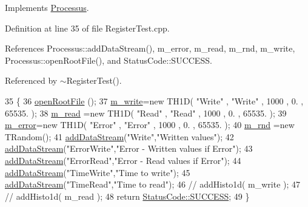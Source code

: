 Implements \hyperlink{classProcessus_aee88ad7b77ae7319cf8b128e9dd2ea11}{Processus}.



Definition at line 35 of file Register\+Test.\+cpp.



References Processus\+::add\+Data\+Stream(), m\+\_\+error, m\+\_\+read, m\+\_\+rnd, m\+\_\+write, Processus\+::open\+Root\+File(), and Status\+Code\+::\+S\+U\+C\+C\+E\+SS.



Referenced by $\sim$\+Register\+Test().


\begin{DoxyCode}
35                                       \{
36   \hyperlink{classProcessus_aacf6812880c1d1a2bf14a4a39458f443}{openRootFile} ();
37   \hyperlink{classRegisterTest_a4e2dbc640871ece43a554425e2b73dcf}{m\_write}=\textcolor{keyword}{new} TH1D( \textcolor{stringliteral}{"Write"} , \textcolor{stringliteral}{"Write"} , 1000 , 0. , 65535. );
38   \hyperlink{classRegisterTest_a5bb74853c26fdf7223244c569c64eb6d}{m\_read} =\textcolor{keyword}{new} TH1D( \textcolor{stringliteral}{"Read"}  , \textcolor{stringliteral}{"Read"}  , 1000 , 0. , 65535. );
39   \hyperlink{classRegisterTest_a9b32a49463a1b1d319fde007607254f0}{m\_error}=\textcolor{keyword}{new} TH1D( \textcolor{stringliteral}{"Error"} , \textcolor{stringliteral}{"Error"} , 1000 , 0. , 65535. );
40   \hyperlink{classRegisterTest_a07e35817b07d61e54caa694d2a0fa210}{m\_rnd} =\textcolor{keyword}{new} TRandom();
41   \hyperlink{classProcessus_a308c8f193802f1d1ab49d4447d0cb281}{addDataStream}(\textcolor{stringliteral}{"Write"},\textcolor{stringliteral}{"Written values"});
42   \hyperlink{classProcessus_a308c8f193802f1d1ab49d4447d0cb281}{addDataStream}(\textcolor{stringliteral}{"ErrorWrite"},\textcolor{stringliteral}{"Error - Written values if Error"});
43   \hyperlink{classProcessus_a308c8f193802f1d1ab49d4447d0cb281}{addDataStream}(\textcolor{stringliteral}{"ErrorRead"},\textcolor{stringliteral}{"Error - Read values if Error"});
44   \hyperlink{classProcessus_a308c8f193802f1d1ab49d4447d0cb281}{addDataStream}(\textcolor{stringliteral}{"TimeWrite"},\textcolor{stringliteral}{"Time to write"});
45   \hyperlink{classProcessus_a308c8f193802f1d1ab49d4447d0cb281}{addDataStream}(\textcolor{stringliteral}{"TimeRead"},\textcolor{stringliteral}{"Time to read"});
46   \textcolor{comment}{//  addHisto1d( m\_write );}
47   \textcolor{comment}{//  addHisto1d( m\_read );}
48   \textcolor{keywordflow}{return} \hyperlink{classStatusCode_a6f565cbeadc76d14c72f047e5e85eb4badd0da38d3ba0d922efd1f4619bc37ad8}{StatusCode::SUCCESS};
49 \}
\end{DoxyCode}
\mbox{\label{classRegisterTest_a5d3726a88a7fdcd90981bb5de8399df9}} 
